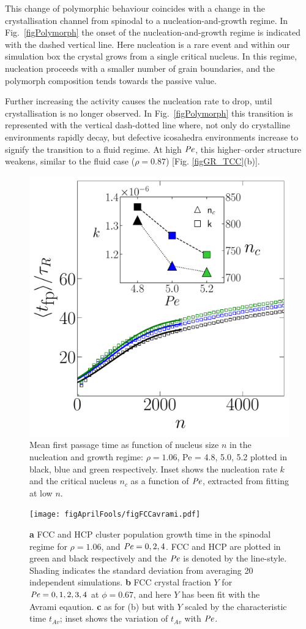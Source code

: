 This change of polymorphic behaviour coincides with a change in the crystallisation channel from spinodal to a nucleation-and-growth regime. In Fig.~\ref{figPolymorph} the onset of the nucleation-and-growth regime is indicated with the dashed vertical line. Here nucleation is a rare event and within our simulation box the crystal grows from a single critical nucleus. In this regime, nucleation proceeds with a smaller number of grain boundaries, and the polymorph composition tends towards the passive value.


Further increasing the activity causes the nucleation rate to drop, until crystallisation is no longer observed. In Fig.~\ref{figPolymorph} this transition is represented with the vertical dash-dotted line where, not only do crystalline environments rapidly decay, but defective icosahedra environments increase to signify the transition to a fluid regime. At high $\operatorname{\mathit{P\kern-.08em e}}$, this higher--order structure weakens, similar to the fluid case ($\rho=0.87$) [Fig. \ref{figGR_TCC}(b)].


\begin{figure}
	\includegraphics[width=0.5\linewidth]{figAprilFools/figMFPT.pdf}
	\centering
	\caption[Mean first passage time]{Mean first passage time as function of nucleus size $n$ in the nucleation and growth regime: $\rho=1.06$, Pe = 4.8, 5.0, 5.2 plotted in black, blue and green respectively. Inset shows the nucleation rate $k$ and the critical nucleus $n_c$ as a function of $\operatorname{\mathit{P\kern-.08em e}}$, extracted from fitting at low $n$.}
		\label{figMFPT}
\end{figure}


\begin{figure}
\texttt{[image: figAprilFools/figFCCavrami.pdf]}

	\caption[Crystal growth in the spinodal regime]{\textbf{a} FCC and HCP cluster population growth time in the spinodal regime for $\rho=1.06$, and $\operatorname{\mathit{P\kern-.08em e}} =0,2,4$. FCC and HCP are plotted in green and black respectively and the $\operatorname{\mathit{P\kern-.08em e}}$ is denoted by the line-style. Shading indicates the standard deviation from averaging 20 independent simulations. \textbf{b} FCC crystal fraction $Y$ for $\operatorname{\mathit{P\kern-.08em e}} =0,1,2,3,4$ at $\phi=0.67$, and  here $Y$ has been fit with the Avrami eqaution. \textbf{c} as for (b) but with $Y$ scaled by the characteristic time $t_{Av}$; inset shows the variation of $t_{Av}$ with $\operatorname{\mathit{P\kern-.08em e}}$.}
		\label{figMeanPopVsT}
\end{figure}


